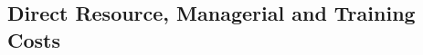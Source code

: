 \begin{appendices}


\subsection{Direct Resource, Managerial and Training Costs}

\begin{landscape}


\end{landscape}
\end{appendices}
